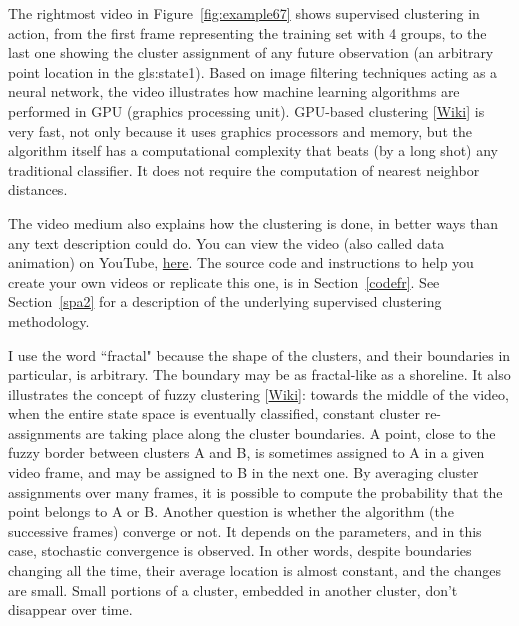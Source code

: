 \documentclass[10pt]{article}
\begin{document}
The rightmost video in Figure~\ref{fig:example67} shows \textcolor{index}{supervised clustering} in action, from the first frame representing the
\textcolor{index}{training set} with 4 groups, to the last one showing the cluster assignment of any future observation (an arbitrary point location
in the \gls{gls:state1}). Based on \textcolor{index}{image filtering} techniques acting as a \textcolor{index}{neural network}, the video illustrates how machine learning algorithms are performed in GPU (graphics processing unit).
\textcolor{index}{GPU-based clustering} [\href{https://en.wikipedia.org/wiki/General-purpose_computing_on_graphics_processing_units}{Wiki}] is very fast, not only because it uses graphics processors and memory, but the algorithm itself has a computational complexity that beats (by a long shot) any traditional classifier. It does not require the computation of \textcolor{index}{nearest neighbor distances}.

The video medium also explains how the clustering is done, in better ways than any text description could do. You can view the video (also called
\textcolor{index}{data animation})
on YouTube, \href{https://www.youtube.com/watch?v=dNPSEh-X6uw}{here}. The source code and instructions to help you create your own
videos or replicate this one, is in Section~\ref{codefr}. See Section~\ref{spa2} for a description of the underlying supervised clustering methodology.

I use the word ``fractal" because the shape of the clusters, and their boundaries in particular, is arbitrary. The boundary may be as fractal-like as a shoreline. It also illustrates the concept of
\textcolor{index}{fuzzy clustering} [\href{https://en.wikipedia.org/wiki/Fuzzy_clustering}{Wiki}]: towards the middle of the video, when the entire state space is eventually classified, constant
cluster re-assignments are taking place along the cluster boundaries. A point, close to the fuzzy border between clusters A and B, is sometimes assigned to A in a given video frame, and may be assigned to B in the next one. By averaging cluster assignments over many frames, it is possible to compute the probability that the point belongs to A or B. Another question is whether
the algorithm (the successive frames) converge or not. It depends on the parameters, and in this case,
\textcolor{index}{stochastic convergence} is observed. In other words, despite boundaries changing all the time, their average location is almost constant,
and the changes are small. Small portions of a cluster, embedded in another cluster, don't disappear over time. \\
\quad \\
\end{document}
